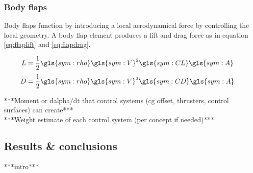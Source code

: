 \subsubsection{Body flaps}
Body flaps function by introducing a local aerodynamical force by controlling the local geometry. A body flap element produces a lift and drag force as in equation \ref{eq:flaplift} and \ref{eq:flapdrag}.
\begin{multicols}{2}
\begin{equation}
L=\frac{1}{2}\gls{sym:rho}\gls{sym:V}^{2}\gls{sym:CL}\gls{sym:A}
\label{eq:flaplift}
\end{equation} \break
\begin{equation}
D=\frac{1}{2}\gls{sym:rho}\gls{sym:V}^{2}\gls{sym:CD}\gls{sym:A}
\label{eq:flapdrag}
\end{equation}
\end{multicols}

***Moment or dalpha/dt that control systems (cg offset, thrusters, control surfaces) can create***\\
***Weight estimate of each control system (per concept if needed)***\\

\subsection{Results \& conclusions}
\label{sec:astrores}
***intro***\\

